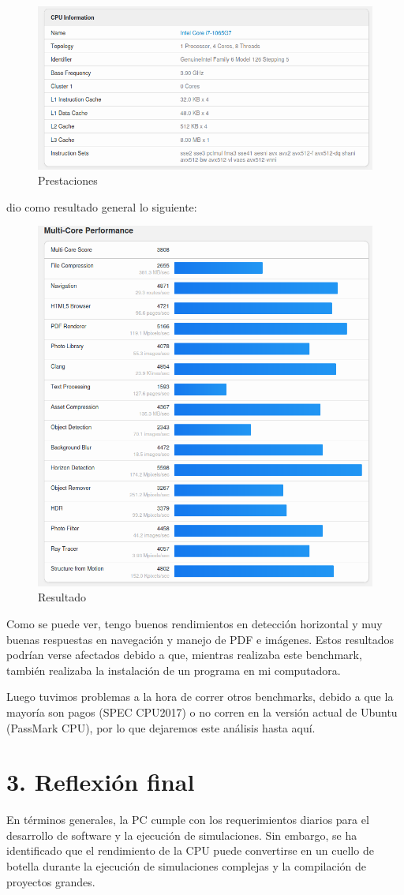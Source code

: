 \begin{figure}[H]
    \centering
    \includegraphics[width=0.7\linewidth]{img/sistema.png}
    \caption{Prestaciones}
    \label{fig:enter-label}
\end{figure}
dio como resultado general lo siguiente:
\begin{figure}[H]
    \centering
    \includegraphics[width=0.7\linewidth]{img/rendimientoGeek.png}
    \caption{Resultado}
\end{figure}

Como se puede ver, tengo buenos rendimientos en detección horizontal y muy buenas respuestas en navegación y manejo de PDF e imágenes. Estos resultados podrían verse afectados debido a que, mientras realizaba este benchmark, también realizaba la instalación de un programa en mi computadora.

Luego tuvimos problemas a la hora de correr otros benchmarks, debido a que la mayoría son pagos (SPEC CPU2017) o no corren en la versión actual de Ubuntu (PassMark CPU), por lo que dejaremos este análisis hasta aquí.

\section*{3. Reflexión final}
En términos generales, la PC cumple con los requerimientos diarios para el desarrollo de software y la ejecución de simulaciones. Sin embargo, se ha identificado que el rendimiento de la CPU puede convertirse en un cuello de botella durante la ejecución de simulaciones complejas y la compilación de proyectos grandes.
